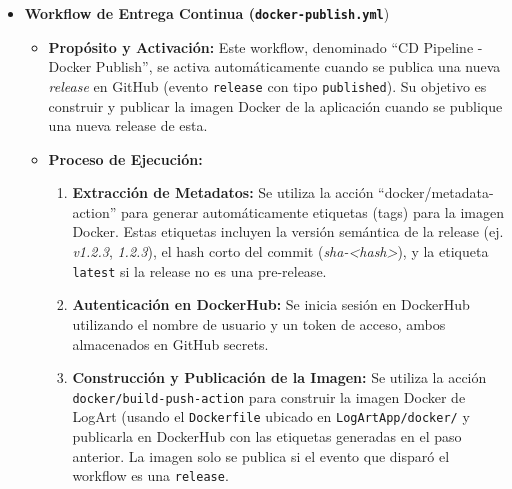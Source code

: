 \begin{itemize}
\begin{itemize}
\begin{enumerate}
                        \item \textbf{Generación de Artefactos:} Si las pruebas de Playwright finalizan (independientemente de si el resultado es exitoso o fallido, siempre que el flujo no se cancele), el sistema genera y sube el informe detallado (\texttt{playwright-report}) como un artefacto del flujo de trabajo. Esto facilita enormemente la depuración de errores en las pruebas E2E al proporcionar trazas visuales de los fallos encontrados.
                        \end{enumerate}
                        \item Este \textit{pipeline} asegura que cada cambio propuesto sea verificado exhaustivamente antes de ser mergeado. La información detallada sobre la estrategia de integración y algunos problemas resueltos, se encuentran en el blog del autor\cite{MorenoCILogArt}.
            \end{itemize}
            \vspace{0.3cm}
        \item \textbf{Workflow de Entrega Continua (\texttt{docker-publish.yml}})
            \begin{itemize}
                \item \textbf{Propósito y Activación:} Este workflow, denominado ``CD Pipeline - Docker Publish'', se activa automáticamente cuando se publica una nueva \textit{release} en GitHub (evento \texttt{release} con tipo \texttt{published}). Su objetivo es construir y publicar la imagen Docker de la aplicación cuando se publique una nueva release de esta.
                \item \textbf{Proceso de Ejecución:}
                    \begin{enumerate}
                        \item \textbf{Extracción de Metadatos:} Se utiliza la acción ``docker/metadata-action'' para generar automáticamente etiquetas (tags) para la imagen Docker. Estas etiquetas incluyen la versión semántica de la release (ej. \textit{v1.2.3}, \textit{1.2.3}), el hash corto del commit (\textit{sha-\textless hash\textgreater}), y la etiqueta \texttt{latest} si la release no es una pre-release.
                        \item \textbf{Autenticación en DockerHub:} Se inicia sesión en DockerHub utilizando el nombre de usuario y un token de acceso, ambos almacenados en GitHub secrets.
                        \item \textbf{Construcción y Publicación de la Imagen:} Se utiliza la acción \texttt{docker/build-push-action} para construir la imagen Docker de LogArt (usando el \texttt{Dockerfile} ubicado en \texttt{LogArtApp/docker/} y publicarla en DockerHub con las etiquetas generadas en el paso anterior. La imagen solo se publica si el evento que disparó el workflow es una \texttt{release}.

\end{enumerate}
\end{itemize}
\end{itemize}
